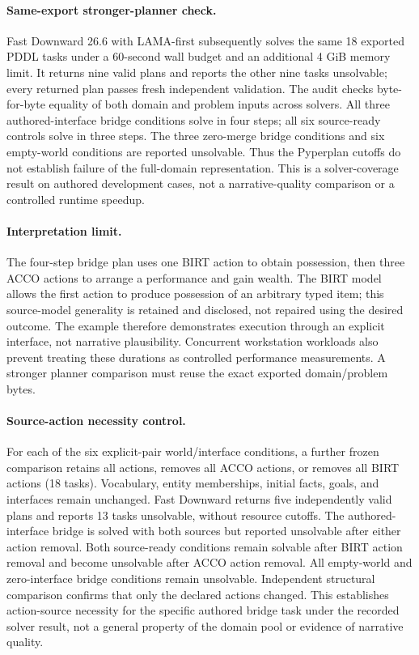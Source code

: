 \documentclass[letterpaper]{article}
\begin{document}
\paragraph{Same-export stronger-planner check.}
Fast Downward 26.6 with LAMA-first subsequently solves the same 18 exported PDDL tasks under a 60-second wall budget and an additional 4 GiB memory limit. It returns nine valid plans and reports the other nine tasks unsolvable; every returned plan passes fresh independent validation. The audit checks byte-for-byte equality of both domain and problem inputs across solvers. All three authored-interface bridge conditions solve in four steps; all six source-ready controls solve in three steps. The three zero-merge bridge conditions and six empty-world conditions are reported unsolvable. Thus the Pyperplan cutoffs do not establish failure of the full-domain representation. This is a solver-coverage result on authored development cases, not a narrative-quality comparison or a controlled runtime speedup.

\paragraph{Interpretation limit.}
The four-step bridge plan uses one BIRT action to obtain possession, then three ACCO actions to arrange a performance and gain wealth. The BIRT model allows the first action to produce possession of an arbitrary typed item; this source-model generality is retained and disclosed, not repaired using the desired outcome. The example therefore demonstrates execution through an explicit interface, not narrative plausibility. Concurrent workstation workloads also prevent treating these durations as controlled performance measurements. A stronger planner comparison must reuse the exact exported domain/problem bytes.

\paragraph{Source-action necessity control.}
For each of the six explicit-pair world/interface conditions, a further frozen comparison retains all actions, removes all ACCO actions, or removes all BIRT actions (18 tasks). Vocabulary, entity memberships, initial facts, goals, and interfaces remain unchanged. Fast Downward returns five independently valid plans and reports 13 tasks unsolvable, without resource cutoffs. The authored-interface bridge is solved with both sources but reported unsolvable after either action removal. Both source-ready conditions remain solvable after BIRT action removal and become unsolvable after ACCO action removal. All empty-world and zero-interface bridge conditions remain unsolvable. Independent structural comparison confirms that only the declared actions changed. This establishes action-source necessity for the specific authored bridge task under the recorded solver result, not a general property of the domain pool or evidence of narrative quality.
\end{document}
